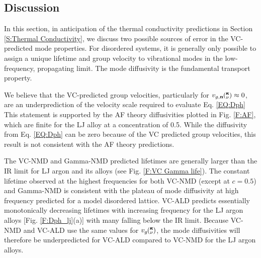 \documentclass[aps,prb,onecolumn,preprint,footinbib,superscriptaddress,amsmath,amssymb,floatfix]{revtex4}
\newcommand{\kv}{\mspace{-4.0mu}\left(\mspace{-8.0mu}
\begin{smallmatrix}&\pmb{\kappa} \\&\nu\end{smallmatrix}
\mspace{-3.0mu}\right)}
\begin{document}
\clearpage

\subsection{\label{S:Discussion}Discussion}

In this section, in anticipation of the thermal conductivity predictions 
in Section \ref{S:Thermal Conductivity}, we discuss two possible sources 
of error in the VC-predicted mode properties. 
For disordered systems, it is generally only possible to assign a 
unique lifetime and group velocity to vibrational modes  
in the low-frequency, propagating limit.
\cite{feldman_numerical_1999,xu_energy_2009} The mode diffusivity 
is the fundamental transport property.
\cite{allen_thermal_1993,feldman_thermal_1993,feldman_numerical_1999} 

We believe that the VC-predicted group velocities, particularly 
for $v_{g,\mathbf{n}}\kv \approx 0$, are an underprediction of the 
velocity scale required to evaluate Eq. \eqref{EQ:Dph} 
This statement is supported by the 
AF theory diffusivities plotted in Fig. \ref{F:AF}, 
which are finite for the LJ alloy at a concentration 
of 0.5. While the diffusivity from Eq. \eqref{EQ:Dph} can be 
zero because of the VC predicted group velocities, this result is not 
consistent with the AF theory predictions.

The VC-NMD and Gamma-NMD predicted lifetimes are generally larger 
than the IR limit  
for LJ argon and its alloys (see Fig. \ref{F:VC Gamma life}). 
The constant lifetime observed at the highest frequencies  
for both VC-NMD (except at $c=0.5$) and Gamma-NMD is 
consistent with the plateau of mode diffusivity at high 
frequency predicted for a model disordered lattice.\cite{sheng_heat_1991} 
VC-ALD predicts essentially monotonically 
decreasing lifetimes with increasing frequency for the LJ argon 
alloys [Fig. \ref{F:Dph_lj}(a)] with many falling below the IR limit. 
Because VC-NMD and VC-ALD use the same values for $v_g\kv$, the 
mode diffusivities will therefore be underpredicted for 
VC-ALD compared to VC-NMD for the LJ argon alloys. 

\end{document}
